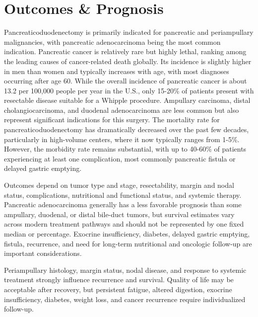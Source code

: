 \section*{Outcomes \& Prognosis}
Pancreaticoduodenectomy is primarily indicated for pancreatic and periampullary malignancies, with pancreatic adenocarcinoma being the most common indication. Pancreatic cancer is relatively rare but highly lethal, ranking among the leading causes of cancer-related death globally. Its incidence is slightly higher in men than women and typically increases with age, with most diagnoses occurring after age 60. While the overall incidence of pancreatic cancer is about 13.2 per 100,000 people per year in the U.S., only 15-20\% of patients present with resectable disease suitable for a Whipple procedure. Ampullary carcinoma, distal cholangiocarcinoma, and duodenal adenocarcinoma are less common but also represent significant indications for this surgery. The mortality rate for pancreaticoduodenectomy has dramatically decreased over the past few decades, particularly in high-volume centers, where it now typically ranges from 1-5\%. However, the morbidity rate remains substantial, with up to 40-60\% of patients experiencing at least one complication, most commonly pancreatic fistula or delayed gastric emptying.

Outcomes depend on tumor type and stage, resectability, margin and nodal status, complications, nutritional and functional status, and systemic therapy. Pancreatic adenocarcinoma generally has a less favorable prognosis than some ampullary, duodenal, or distal bile-duct tumors, but survival estimates vary across modern treatment pathways and should not be represented by one fixed median or percentage. Exocrine insufficiency, diabetes, delayed gastric emptying, fistula, recurrence, and need for long-term nutritional and oncologic follow-up are important considerations.

Periampullary histology, margin status, nodal disease, and response to systemic treatment strongly influence recurrence and survival. Quality of life may be acceptable after recovery, but persistent fatigue, altered digestion, exocrine insufficiency, diabetes, weight loss, and cancer recurrence require individualized follow-up.

